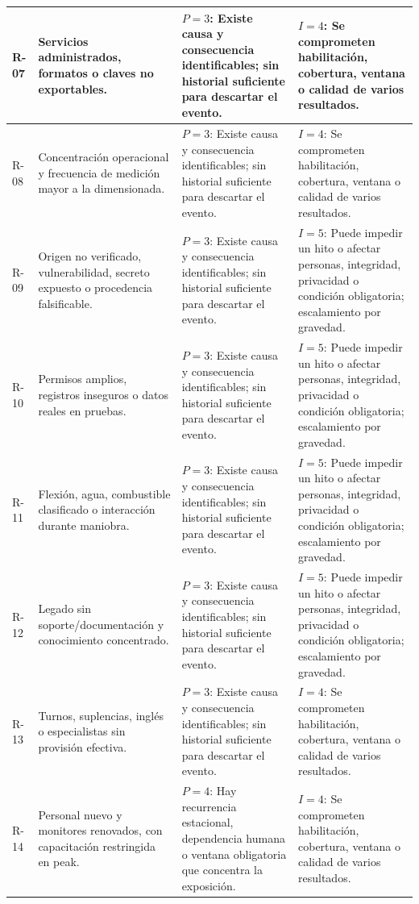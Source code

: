 \begin{longtable}{L{.10\textwidth}L{.27\textwidth}L{.27\textwidth}L{.27\textwidth}}
R-07 & Servicios administrados, formatos o claves no exportables. & $P=3$: Existe causa y consecuencia identificables; sin historial suficiente para descartar el evento. & $I=4$: Se comprometen habilitación, cobertura, ventana o calidad de varios resultados.\\\hline
R-08 & Concentración operacional y frecuencia de medición mayor a la dimensionada. & $P=3$: Existe causa y consecuencia identificables; sin historial suficiente para descartar el evento. & $I=4$: Se comprometen habilitación, cobertura, ventana o calidad de varios resultados.\\\hline
R-09 & Origen no verificado, vulnerabilidad, secreto expuesto o procedencia falsificable. & $P=3$: Existe causa y consecuencia identificables; sin historial suficiente para descartar el evento. & $I=5$: Puede impedir un hito o afectar personas, integridad, privacidad o condición obligatoria; escalamiento por gravedad.\\\hline
R-10 & Permisos amplios, registros inseguros o datos reales en pruebas. & $P=3$: Existe causa y consecuencia identificables; sin historial suficiente para descartar el evento. & $I=5$: Puede impedir un hito o afectar personas, integridad, privacidad o condición obligatoria; escalamiento por gravedad.\\\hline
R-11 & Flexión, agua, combustible clasificado o interacción durante maniobra. & $P=3$: Existe causa y consecuencia identificables; sin historial suficiente para descartar el evento. & $I=5$: Puede impedir un hito o afectar personas, integridad, privacidad o condición obligatoria; escalamiento por gravedad.\\\hline
R-12 & Legado sin soporte/documentación y conocimiento concentrado. & $P=3$: Existe causa y consecuencia identificables; sin historial suficiente para descartar el evento. & $I=5$: Puede impedir un hito o afectar personas, integridad, privacidad o condición obligatoria; escalamiento por gravedad.\\\hline
R-13 & Turnos, suplencias, inglés o especialistas sin provisión efectiva. & $P=3$: Existe causa y consecuencia identificables; sin historial suficiente para descartar el evento. & $I=4$: Se comprometen habilitación, cobertura, ventana o calidad de varios resultados.\\\hline
R-14 & Personal nuevo y monitores renovados, con capacitación restringida en peak. & $P=4$: Hay recurrencia estacional, dependencia humana o ventana obligatoria que concentra la exposición. & $I=4$: Se comprometen habilitación, cobertura, ventana o calidad de varios resultados.\\\hline

\end{longtable}
